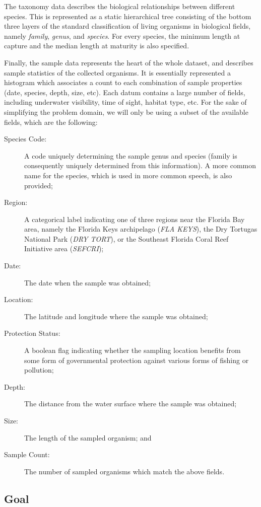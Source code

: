 \documentclass[letterpaper]{article} %
\begin{document}
The taxonomy data describes the biological relationships between different
species.  This is represented as a static hierarchical tree consisting of the
bottom three layers of the standard classification of living organisms in
biological fields, namely \emph{family}, \emph{genus}, and \emph{species}.  For
every species, the minimum length at capture and the median length at maturity
is also specified.

Finally, the sample data represents the heart of the whole dataset, and
describes sample statistics of the collected organisms.  It is essentially
represented a histogram which associates a count to each combination of sample
properties (date, species, depth, size, etc).  Each datum contains a large
number of fields, including underwater visibility, time of sight, habitat type,
etc.  For the sake of simplifying the problem domain, we will only be using
a subset of the available fields, which are the following:
%
\begin{description}
%
  \item[Species Code:]  A code uniquely determining the sample genus and
    species (family is consequently uniquely determined from this information).
    A more common name for the species, which is used in more common speech, is
    also provided;
%
  \item[Region:]  A categorical label indicating one of three regions near the
    Florida Bay area, namely the Florida Keys archipelago (\textit{FLA KEYS}),
    the Dry Tortugas National Park (\textit{DRY TORT}), or the Southeast
    Florida Coral Reef Initiative area (\textit{SEFCRI});
%
  \item[Date:]  The date when the sample was obtained;
%
  \item[Location:]  The latitude and longitude where the sample was obtained;
%
  \item[Protection Status:]  A boolean flag indicating whether the sampling
    location benefits from some form of governmental protection against various
    forms of fishing or pollution;
%
  \item[Depth:]  The distance from the water surface where the sample was
    obtained;
%
  \item[Size:]  The length of the sampled organism; and
%
  \item[Sample Count:]  The number of sampled organisms which match the above
    fields.
%
\end{description}

\subsection{Goal}
\end{document}
